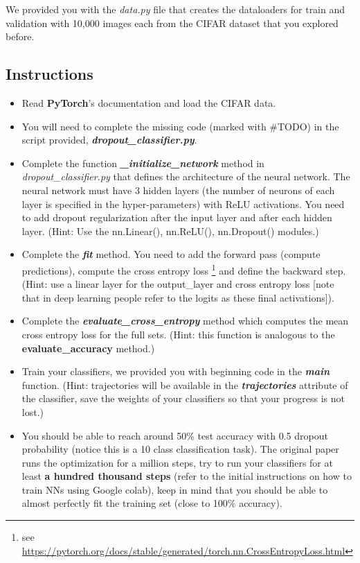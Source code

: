 \documentclass{article}
\begin{document}
We provided you with the \textit{data.py} file that creates the dataloaders for train and validation with 10,000 images each from the CIFAR dataset that you explored before.

\subsection{Instructions}
\begin{itemize}
\item Read \textbf{PyTorch}'s documentation and load the CIFAR data.
\item You will need to complete the missing code (marked with \#TODO) in the script provided, \textbf{\textit{dropout\_classifier.py}}.
\item Complete the function \textbf{\textit{\_initialize\_network}} method in \textit{dropout\_classifier.py} that defines the architecture of the neural network. The neural network must have 3 hidden layers (the number of neurons of each layer is specified in the hyper-parameters) with ReLU activations. You need to add dropout regularization after the input layer and after each hidden layer. (Hint: Use the nn.Linear(), nn.ReLU(), nn.Dropout() modules.)

\item Complete the \textbf{\textit{fit}} method. You need to add the forward pass (compute predictions), compute the cross entropy loss \footnote{see \url{https://pytorch.org/docs/stable/generated/torch.nn.CrossEntropyLoss.html}} and define the backward step. (Hint: use a linear layer for the output\_layer and cross entropy loss [note that in deep learning people refer to the logits as these final activations]).

\item Complete the \textbf{\textit{evaluate\_cross\_entropy}} method which computes the mean cross entropy loss for the full sets. (Hint: this function is analogous to the \textbf{evaluate\_accuracy} method.)


\item Train your classifiers, we provided you with beginning code in the \textbf{\textit{main}} function. (Hint: trajectories will be available in the \textbf{\textit{trajectories}} attribute of the classifier, save the weights of your classifiers so that your progress is not lost.)

\item You should be able to reach around 50\%
test accuracy with 0.5 dropout probability (notice this is a 10 class classification task). The original paper runs the optimization for a million steps, try to run your classifiers for at least \textbf{a hundred thousand steps} (refer to the initial instructions on how to train NNs using Google colab), keep in mind that you should be able to almost perfectly fit the training set (close to 100\% accuracy).

\end{itemize}
\end{document}
